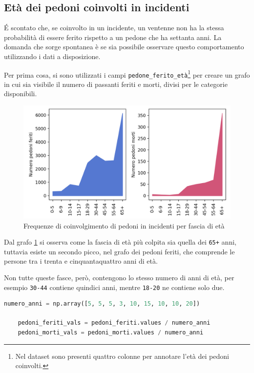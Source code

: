 \documentclass[a4paper,12pt]{report}
\newcommand{\columnstyle}[1]{\texttt{#1}}
\begin{document}
\subsection{Età dei pedoni coinvolti in incidenti}

\'E scontato che, se coinvolto in un incidente, un ventenne non ha la stessa 
probabilità di essere ferito rispetto a un pedone che ha settanta anni.
La domanda che sorge spontanea è se sia possibile osservare questo comportamento 
utilizzando i dati a disposizione.

Per prima cosa, si sono utilizzati i campi 
\columnstyle{pedone\_ferito\_età}\footnote{Nel dataset sono presenti quattro colonne per 
annotare l'età dei pedoni coinvolti.} 
per creare un grafo in cui sia visibile il numero di passanti feriti e morti, 
divisi per le categorie disponibili.

\begin{figure}
    \includegraphics[width=\linewidth]{../src/incidenti/incidenti_senza_coords/pedoni/eta_pedoni_iniziale.png}
    \caption{Frequenze di coinvolgimento di pedoni in incidenti per fascia di età}
    \label{fig:eta-pedoni-iniziale}
\end{figure}

Dal grafo \ref{fig:eta-pedoni-iniziale} si osserva come la fascia di età più colpita 
sia quella dei \columnstyle{65+} anni, tuttavia esiste un secondo picco, nel grafo dei 
pedoni feriti, che comprende le persone tra i trenta e cinquantaquattro anni di età.

Non tutte queste fasce, però, contengono lo stesso numero di anni di età, 
per esempio \columnstyle{30-44} contiene quindici anni, mentre 
\columnstyle{18-20} ne contiene solo due.

\begin{lstlisting}[language=Python]
    numero_anni = np.array([5, 5, 5, 3, 10, 15, 10, 10, 20])

    pedoni_feriti_vals = pedoni_feriti.values / numero_anni
    pedoni_morti_vals = pedoni_morti.values / numero_anni
\end{lstlisting}
\end{document}
